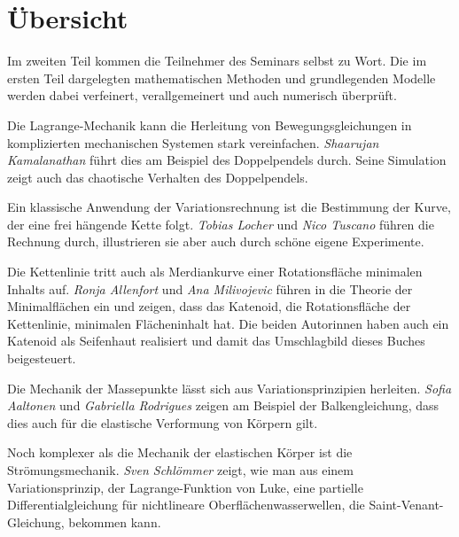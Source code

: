%
%
%
\chapter*{Übersicht}
\fancyhead[RE]{}
\label{buch:uebersicht}
Im zweiten Teil kommen die Teilnehmer des Seminars selbst zu Wort.
Die im ersten Teil dargelegten mathematischen Methoden und
grundlegenden Modelle werden dabei verfeinert, verallgemeinert
und auch numerisch überprüft.

Die Lagrange-Mechanik kann die Herleitung von Bewegungsgleichungen
in komplizierten mechanischen Systemen stark vereinfachen.
\textit{Shaarujan Kamalanathan} führt dies am Beispiel des
Doppelpendels durch.
Seine Simulation zeigt auch das chaotische Verhalten des Doppelpendels.

Ein klassische Anwendung der Variationsrechnung ist die Bestimmung
der Kurve, der eine frei hängende Kette folgt.
\textit{Tobias Locher} und \textit{Nico Tuscano}
führen die Rechnung durch, illustrieren sie aber auch durch schöne
eigene Experimente.

Die Kettenlinie tritt auch als Merdiankurve einer Rotationsfläche
minimalen Inhalts auf.
\textit{Ronja Allenfort} und \textit{Ana Milivojevic} führen in die
Theorie der Minimalflächen ein und zeigen, dass das Katenoid,
die Rotationsfläche der Kettenlinie, minimalen Flächeninhalt hat.
Die beiden Autorinnen haben auch ein Katenoid als Seifenhaut
realisiert und damit das Umschlagbild dieses Buches beigesteuert.

Die Mechanik der Massepunkte lässt sich aus Variationsprinzipien
herleiten.
\textit{Sofia Aaltonen} und \textit{Gabriella Rodrigues} zeigen
am Beispiel der Balkengleichung, dass dies auch für die elastische 
Verformung von Körpern gilt.

Noch komplexer als die Mechanik der elastischen Körper ist die
Strömungsmechanik.
\textit{Sven Schlömmer} zeigt, wie man aus einem Variationsprinzip,
der Lagrange-Funktion von Luke, eine partielle Differentialgleichung
für nichtlineare Oberflächenwasserwellen, die Saint-Venant-Gleichung,
bekommen kann.

